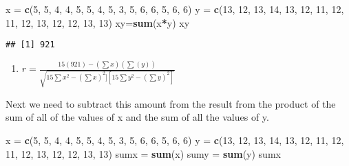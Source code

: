 \documentclass[]{article}
\newenvironment{Shaded}{\begin{snugshade}}{\end{snugshade}}
\newcommand{\KeywordTok}[1]{\textcolor[rgb]{0.13,0.29,0.53}{\textbf{#1}}}
\newcommand{\DecValTok}[1]{\textcolor[rgb]{0.00,0.00,0.81}{#1}}
\newcommand{\StringTok}[1]{\textcolor[rgb]{0.31,0.60,0.02}{#1}}
\newcommand{\OperatorTok}[1]{\textcolor[rgb]{0.81,0.36,0.00}{\textbf{#1}}}
\newcommand{\NormalTok}[1]{#1}
\providecommand{\tightlist}{%
  \setlength{\itemsep}{0pt}\setlength{\parskip}{0pt}}
\begin{document}
\begin{Shaded}
\begin{Highlighting}[]
\NormalTok{x =}\StringTok{ }\KeywordTok{c}\NormalTok{(}\DecValTok{5}\NormalTok{, }\DecValTok{5}\NormalTok{, }\DecValTok{4}\NormalTok{, }\DecValTok{4}\NormalTok{, }\DecValTok{5}\NormalTok{, }\DecValTok{5}\NormalTok{, }\DecValTok{4}\NormalTok{, }\DecValTok{5}\NormalTok{, }\DecValTok{3}\NormalTok{, }\DecValTok{5}\NormalTok{, }\DecValTok{6}\NormalTok{, }\DecValTok{6}\NormalTok{, }\DecValTok{5}\NormalTok{, }\DecValTok{6}\NormalTok{, }\DecValTok{6}\NormalTok{)}
\NormalTok{y =}\StringTok{ }\KeywordTok{c}\NormalTok{(}\DecValTok{13}\NormalTok{, }\DecValTok{12}\NormalTok{, }\DecValTok{13}\NormalTok{, }\DecValTok{14}\NormalTok{, }\DecValTok{13}\NormalTok{, }\DecValTok{12}\NormalTok{, }\DecValTok{11}\NormalTok{, }\DecValTok{12}\NormalTok{, }\DecValTok{11}\NormalTok{, }\DecValTok{12}\NormalTok{, }\DecValTok{13}\NormalTok{, }\DecValTok{12}\NormalTok{, }\DecValTok{12}\NormalTok{, }\DecValTok{13}\NormalTok{, }\DecValTok{13}\NormalTok{)}
\NormalTok{xy=}\KeywordTok{sum}\NormalTok{(x}\OperatorTok{*}\NormalTok{y)}
\NormalTok{xy}
\end{Highlighting}
\end{Shaded}

\begin{verbatim}
## [1] 921
\end{verbatim}

\begin{enumerate}
\def\labelenumi{\arabic{enumi}.}
\setcounter{enumi}{2}
\tightlist
\item
  \(r = \frac{15(921)-(\sum x)(\sum(y))}{\sqrt{15 \sum x ^2-(\sum x)^2][15 \sum y ^2-(\sum y)^2]}}\)
\end{enumerate}

Next we need to subtract this amount from the result from the product of
the sum of all of the values of x and the sum of all the values of y.

\begin{Shaded}
\begin{Highlighting}[]
\NormalTok{x =}\StringTok{ }\KeywordTok{c}\NormalTok{(}\DecValTok{5}\NormalTok{, }\DecValTok{5}\NormalTok{, }\DecValTok{4}\NormalTok{, }\DecValTok{4}\NormalTok{, }\DecValTok{5}\NormalTok{, }\DecValTok{5}\NormalTok{, }\DecValTok{4}\NormalTok{, }\DecValTok{5}\NormalTok{, }\DecValTok{3}\NormalTok{, }\DecValTok{5}\NormalTok{, }\DecValTok{6}\NormalTok{, }\DecValTok{6}\NormalTok{, }\DecValTok{5}\NormalTok{, }\DecValTok{6}\NormalTok{, }\DecValTok{6}\NormalTok{)}
\NormalTok{y =}\StringTok{ }\KeywordTok{c}\NormalTok{(}\DecValTok{13}\NormalTok{, }\DecValTok{12}\NormalTok{, }\DecValTok{13}\NormalTok{, }\DecValTok{14}\NormalTok{, }\DecValTok{13}\NormalTok{, }\DecValTok{12}\NormalTok{, }\DecValTok{11}\NormalTok{, }\DecValTok{12}\NormalTok{, }\DecValTok{11}\NormalTok{, }\DecValTok{12}\NormalTok{, }\DecValTok{13}\NormalTok{, }\DecValTok{12}\NormalTok{, }\DecValTok{12}\NormalTok{, }\DecValTok{13}\NormalTok{, }\DecValTok{13}\NormalTok{)}
\NormalTok{sumx =}\StringTok{ }\KeywordTok{sum}\NormalTok{(x)}
\NormalTok{sumy =}\StringTok{ }\KeywordTok{sum}\NormalTok{(y)}
\NormalTok{sumx}
\end{Highlighting}
\end{Shaded}
\end{document}

